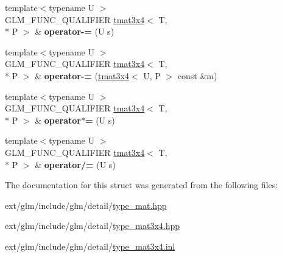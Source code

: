 \begin{DoxyCompactItemize}
\item 
\hypertarget{structglm_1_1tmat3x4_a15e2144679bbd267e558953161329d8e}{{\footnotesize template$<$typename U $>$ }\\G\-L\-M\-\_\-\-F\-U\-N\-C\-\_\-\-Q\-U\-A\-L\-I\-F\-I\-E\-R \hyperlink{structglm_1_1tmat3x4}{tmat3x4}$<$ T, \\*
P $>$ \& {\bfseries operator-\/=} (U s)}\label{structglm_1_1tmat3x4_a15e2144679bbd267e558953161329d8e}

\item 
\hypertarget{structglm_1_1tmat3x4_ad0445e23bd233b7c793c91519cf1c817}{{\footnotesize template$<$typename U $>$ }\\G\-L\-M\-\_\-\-F\-U\-N\-C\-\_\-\-Q\-U\-A\-L\-I\-F\-I\-E\-R \hyperlink{structglm_1_1tmat3x4}{tmat3x4}$<$ T, \\*
P $>$ \& {\bfseries operator-\/=} (\hyperlink{structglm_1_1tmat3x4}{tmat3x4}$<$ U, P $>$ const \&m)}\label{structglm_1_1tmat3x4_ad0445e23bd233b7c793c91519cf1c817}

\item 
\hypertarget{structglm_1_1tmat3x4_ada114a6d8a4f1b662be96a3e5e0bc910}{{\footnotesize template$<$typename U $>$ }\\G\-L\-M\-\_\-\-F\-U\-N\-C\-\_\-\-Q\-U\-A\-L\-I\-F\-I\-E\-R \hyperlink{structglm_1_1tmat3x4}{tmat3x4}$<$ T, \\*
P $>$ \& {\bfseries operator$\ast$=} (U s)}\label{structglm_1_1tmat3x4_ada114a6d8a4f1b662be96a3e5e0bc910}

\item 
\hypertarget{structglm_1_1tmat3x4_a2cf29af3f032cdab63648fb0d4776274}{{\footnotesize template$<$typename U $>$ }\\G\-L\-M\-\_\-\-F\-U\-N\-C\-\_\-\-Q\-U\-A\-L\-I\-F\-I\-E\-R \hyperlink{structglm_1_1tmat3x4}{tmat3x4}$<$ T, \\*
P $>$ \& {\bfseries operator/=} (U s)}\label{structglm_1_1tmat3x4_a2cf29af3f032cdab63648fb0d4776274}

\end{DoxyCompactItemize}


The documentation for this struct was generated from the following files\-:\begin{DoxyCompactItemize}
\item 
ext/glm/include/glm/detail/\hyperlink{type__mat_8hpp}{type\-\_\-mat.\-hpp}\item 
ext/glm/include/glm/detail/\hyperlink{type__mat3x4_8hpp}{type\-\_\-mat3x4.\-hpp}\item 
ext/glm/include/glm/detail/\hyperlink{type__mat3x4_8inl}{type\-\_\-mat3x4.\-inl}\end{DoxyCompactItemize}
